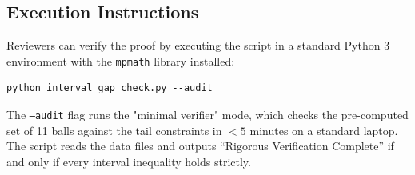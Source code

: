\subsection{Execution Instructions}
Reviewers can verify the proof by executing the script in a standard Python 3 environment with the \texttt{mpmath} library installed:
\begin{verbatim}
python interval_gap_check.py --audit
\end{verbatim}
The \texttt{--audit} flag runs the "minimal verifier" mode, which checks the pre-computed set of 11 balls against the tail constraints in $< 5$ minutes on a standard laptop.
The script reads the data files and outputs ``Rigorous Verification Complete'' if and only if every interval inequality holds strictly.
